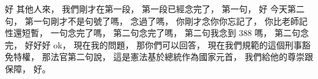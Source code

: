 \hypertarget{c11:cue:92}{}好 其他人來，
\hypertarget{c11:cue:93}{}我們剛才在第一段，
\hypertarget{c11:cue:94}{}第一段已經念完了，
\hypertarget{c11:cue:95}{}第一句，
\hypertarget{c11:cue:96}{}好 今天第二句，
\hypertarget{c11:cue:97}{}第一句剛才不是句號了嗎，
\hypertarget{c11:cue:98}{}念過了嗎，
\hypertarget{c11:cue:99}{}你剛才念你你忘記了，
\hypertarget{c11:cue:100}{}你比老師記性還短暫，
\hypertarget{c11:cue:101}{}一句念完了嗎，
\hypertarget{c11:cue:102}{}第二句念完了嗎，
\hypertarget{c11:cue:103}{}第二句我念到 388 嗎，
\hypertarget{c11:cue:104}{}第二句念完，
\hypertarget{c11:cue:105}{}好好好 ok，
\hypertarget{c11:cue:106}{}現在我的問題，
\hypertarget{c11:cue:107}{}那你們可以回答，
\hypertarget{c11:cue:108}{}現在我們規範的這個刑事豁免特權，
\hypertarget{c11:cue:109}{}那法官第二句說，
\hypertarget{c11:cue:110}{}這是憲法基於總統作為國家元首，
\hypertarget{c11:cue:111}{}我們給他的尊崇跟保障，
\hypertarget{c11:cue:112}{}好。

